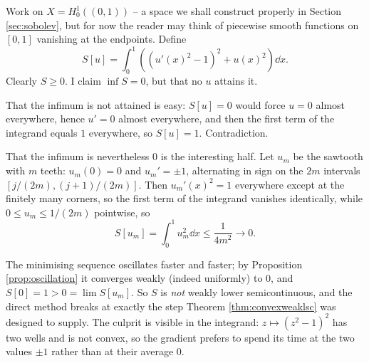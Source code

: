 \begin{example}[Bolza]\label{ex:bolza}
	Work on $X = H_0^1((0,1))$ -- a space we shall construct properly in Section \ref{sec:sobolev}, but for now the reader may think of piecewise smooth functions on $[0,1]$ vanishing at the endpoints. Define
	$$S[u]=\int_0^1\left( \left(u'(x)^2-1\right)^2+u(x)^2\right)\dd x.$$
	Clearly $S \ge 0$. I claim $\inf S = 0$, but that no $u$ attains it.

	That the infimum is not attained is easy: $S[u]=0$ would force $u = 0$ almost everywhere, hence $u' = 0$ almost everywhere, and then the first term of the integrand equals $1$ everywhere, so $S[u]=1$. Contradiction.

	That the infimum is nevertheless $0$ is the interesting half. Let $u_m$ be the sawtooth with $m$ teeth: $u_m(0)=0$ and $u_m'=\pm1$, alternating in sign on the $2m$ intervals $[j/(2m),(j+1)/(2m)]$. Then $u_m'(x)^2= 1$ everywhere except at the finitely many corners, so the first term of the integrand vanishes identically, while $0 \le u_m \le 1/(2m)$ pointwise, so
	$$S[u_m]=\int_0^1u_m^2\dd x\le\frac{1}{4m^2}\longrightarrow 0.$$
\begin{center}
\end{center}
	The minimising sequence oscillates faster and faster; by Proposition \ref{prop:oscillation} it converges weakly (indeed uniformly) to $0$, and $S[0]=1 > 0 = \lim S[u_m]$. So $S$ is \emph{not} weakly lower semicontinuous, and the direct method breaks at exactly the step Theorem \ref{thm:convexweaklsc} was designed to supply. The culprit is visible in the integrand: $z \mapsto (z^2-1)^2$ has two wells and is not convex, so the gradient prefers to spend its time at the two values $\pm 1$ rather than at their average $0$.
\end{example}

